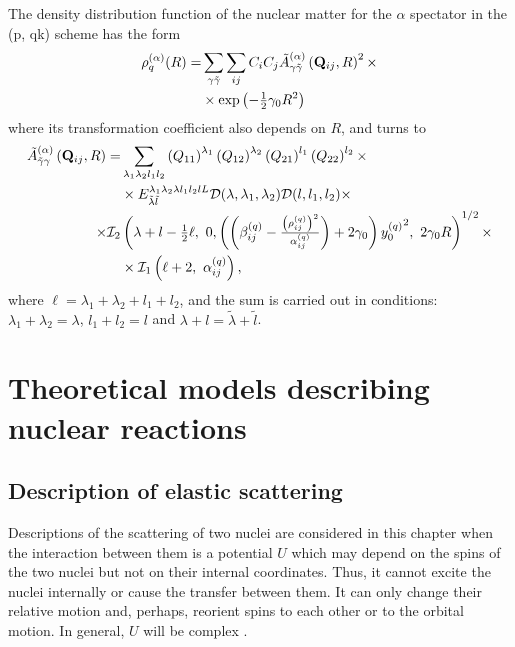 \documentclass[
12pt, %
oneside, %
english, %
onehalfspacing, %
onehalfspacing, %
headsepline, %
]{MastersDoctoralThesis} %
\begin{document}
The density distribution function of the nuclear matter for the $\alpha$ spectator in the (p, qk) scheme has the form
\begin{align}
\rho_q^{(\alpha)}(R)= &
\sum_{\gamma \tilde{\gamma}}
\sum_{ij}
C_i C_j
\tilde{A}^{(\alpha)}_{\gamma\tilde{\gamma}}\left( {\bf Q}_{ij}, R \right)^2
\times \nonumber \\
& \times
{\rm exp} \left( -\tfrac{1}{2} 
\gamma_0 R^2
\right)
\label{pqk_density_a}
\end{align}
where its transformation coefficient also depends on $R$, and  turns to
\begin{align}
\tilde{A}^{(\alpha)}_{\tilde{\gamma}\gamma}\left( {\bf Q}_{ij}, R \right) = & \sum_{\lambda_1 \lambda_2 l_1 l_2} 
\left({ Q}_{11} \right)^{\lambda_1} 
\left({ Q}_{12} \right)^{\lambda_2} 
\left({ Q}_{21} \right)^{l_1} 
\left({ Q}_{22}\right)^{l_2} 
\times \nonumber
\\
& \times {E}^{\lambda_1 \lambda_2 \lambda l_1 l_2 l L}_{\tilde{\lambda} \tilde{l} } \mathcal{D}(\lambda,\lambda_1,\lambda_2) \mathcal{D}(l,l_1,l_2)
\times  \nonumber    \\
 \times 
 \mathcal{I}_2 & \left( \lambda + l - \tfrac{1}{2} \ell, 
~0, 
\left( \left(  \beta^{(q)}_{ij} - \tfrac{\left(\rho^{(q)}_{ij}\right)^2}{\alpha^{(q)}_{ij}} \right) +2 \gamma_0 \right) {y_0^{(q)}}^2,~
2\gamma_0 R
 \right)^{1/2} \times \nonumber \\
& \times  \mathcal{I}_1 \left( \ell +2,~ \alpha_{ij}^{(q)} \right)
 ,
\end{align}
where $\ell=\lambda_1+\lambda_2+l_1+l_2$, and the sum is carried out in conditions: $\lambda_1+\lambda_2=\lambda$, $l_1+l_2=l$ and $\lambda+l=\tilde{\lambda}+\tilde{l}$.

\chapter{Theoretical models describing nuclear reactions} %

\label{Chapter2} %


\section{Description of elastic scattering}
Descriptions of the scattering of two nuclei are considered in this chapter when the interaction between them is a potential $U$ which may depend on the spins of the two nuclei but not on their internal coordinates. Thus, it cannot excite the nuclei internally or cause the transfer between them. It can only change their relative motion and, perhaps, reorient spins to each other or to the orbital motion. In general, $U$ will be complex \cite{satchler1983}. 
\end{document}
